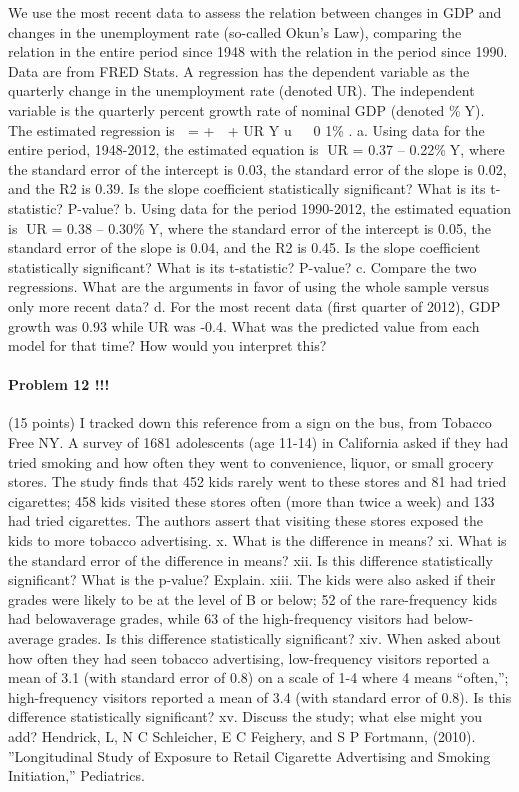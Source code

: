 \documentclass[]{article}
\let\oldparagraph\paragraph
\renewcommand{\paragraph}[1]{\oldparagraph{#1}\mbox{}}
\begin{document}
We use the most recent data to assess the relation between changes in
GDP and changes in the unemployment rate (so-called Okun's Law),
comparing the relation in the entire period since 1948 with the relation
in the period since 1990. Data are from FRED Stats. A regression has the
dependent variable as the quarterly change in the unemployment rate
(denotedUR). The independent variable is the quarterly percent growth
rate of nominal GDP (denoted \%Y). The estimated regression is  = + 
+ UR Y u   0 1\% . a. Using data for the entire period, 1948-2012, the
estimated equation is UR = 0.37 -- 0.22\%Y, where the standard error
of the intercept is 0.03, the standard error of the slope is 0.02, and
the R2 is 0.39. Is the slope coefficient statistically significant? What
is its t-statistic? P-value? b. Using data for the period 1990-2012, the
estimated equation is UR = 0.38 -- 0.30\%Y, where the standard error
of the intercept is 0.05, the standard error of the slope is 0.04, and
the R2 is 0.45. Is the slope coefficient statistically significant? What
is its t-statistic? P-value? c. Compare the two regressions. What are
the arguments in favor of using the whole sample versus only more recent
data? d. For the most recent data (first quarter of 2012), GDP growth
was 0.93 while UR was -0.4. What was the predicted value from each model
for that time? How would you interpret this?

\paragraph{Problem 12 !!!}\label{problem-12}

(15 points) I tracked down this reference from a sign on the bus, from
Tobacco Free NY. A survey of 1681 adolescents (age 11-14) in California
asked if they had tried smoking and how often they went to convenience,
liquor, or small grocery stores. The study finds that 452 kids rarely
went to these stores and 81 had tried cigarettes; 458 kids visited these
stores often (more than twice a week) and 133 had tried cigarettes. The
authors assert that visiting these stores exposed the kids to more
tobacco advertising. x. What is the difference in means? xi. What is the
standard error of the difference in means? xii. Is this difference
statistically significant? What is the p-value? Explain. xiii. The kids
were also asked if their grades were likely to be at the level of B or
below; 52 of the rare-frequency kids had belowaverage grades, while 63
of the high-frequency visitors had below-average grades. Is this
difference statistically significant? xiv. When asked about how often
they had seen tobacco advertising, low-frequency visitors reported a
mean of 3.1 (with standard error of 0.8) on a scale of 1-4 where 4 means
``often,''; high-frequency visitors reported a mean of 3.4 (with
standard error of 0.8). Is this difference statistically significant?
xv. Discuss the study; what else might you add? Hendrick, L, N C
Schleicher, E C Feighery, and S P Fortmann, (2010). ''Longitudinal Study
of Exposure to Retail Cigarette Advertising and Smoking Initiation,''
Pediatrics.
\end{document}
